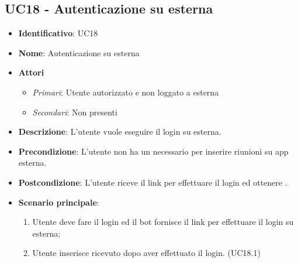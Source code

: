 \subsection{UC18 - Autenticazione su  esterna}
\begin{itemize}
	\item \textbf{Identificativo}: UC18
	\item \textbf{Nome}: Autenticazione su  esterna
	\item \textbf{Attori}
	\begin{itemize} 
		\item \textit{Primari}: Utente autorizzato e non loggato a  esterna
		\item \textit{Secondari}: Non presenti
	\end{itemize}
	\item \textbf{Descrizione}: L'utente vuole eseguire il login su  esterna.
	\item \textbf{Precondizione}: L'utente non ha un  necessario per inserire riunioni su app esterna.
	\item \textbf{Postcondizione}: L'utente riceve il link per effettuare il login ed ottenere .
	\item \textbf{Scenario principale}: \begin{enumerate}
		\item Utente deve fare il login ed il bot fornisce il link per effettuare il login su  esterna; 
		\item Utente inserisce  ricevuto dopo aver effettuato il login. (UC18.1)
	\end{enumerate}
\end{itemize}

